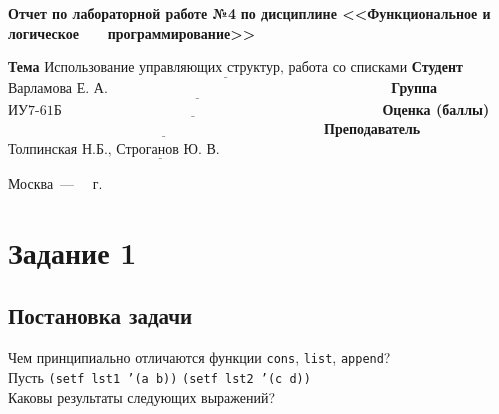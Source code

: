 \documentclass[12pt]{report}
\begin{document}
\begin{titlepage}
		\begin{center}
			\noindent\begin{minipage}{1.1\textwidth}\centering
				\Large\textbf{  Отчет по лабораторной работе №4}\newline
				\textbf{по дисциплине <<Функциональное и логическое}\newline
				\textbf{~~~программирование>>}\newline\newline
			\end{minipage}
		\end{center}
		
		\noindent\textbf{Тема} $\underline{\text{Использование управляющих структур, работа со списками}}$\newline\newline
		\noindent\textbf{Студент} $\underline{\text{Варламова Е. А.~~~~~~~~~~~~~~~~~~~~~~~~~~~~~~~~~~~~~~~~~~~~~~~~~~~~~~~~~~~~}}$\newline\newline
		\noindent\textbf{Группа} $\underline{\text{ИУ7-61Б~~~~~~~~~~~~~~~~~~~~~~~~~~~~~~~~~~~~~~~~~~~~~~~~~~~~~~~~~~~~~~~~~~~~}}$\newline\newline
		\noindent\textbf{Оценка (баллы)} $\underline{\text{~~~~~~~~~~~~~~~~~~~~~~~~~~~~~~~~~~~~~~~~~~~~~~~~~~~~~~~~~~~~~~~~~~~}}$\newline\newline
		\noindent\textbf{Преподаватель} $\underline{\text{Толпинская Н.Б., Строганов Ю. В.~~~~~~~~~~~~~~~~~~~~}}$\newline\newline\newline
		
		\begin{center}
			\vfill
			Москва~---~\the\year
			~г.
		\end{center}
	\end{titlepage}
\setcounter{page}{2}
\section*{Задание 1}
\subsection*{Постановка задачи}
Чем принципиально отличаются функции \texttt{cons}, \texttt{list}, \texttt{append}?\\
\indent Пусть \texttt{(setf lst1 '(a b))} \texttt{(setf lst2 '(c d))}\\
\indent Каковы результаты следующих выражений?
\end{document}
